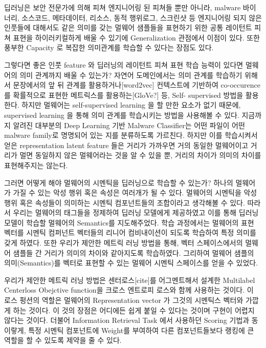 딥러닝은 보안 전문가에 의해 피쳐 엔지니어링 된 피쳐들 뿐만 아니라, malware 바이너리, 소스코드, 메타데이터, 리소스, 동적 행위로그, 스크린샷 등 엔지니어링 되지 않은 인풋들에 대해서도 같은 의미를 갖는 멀웨어 샘플들을 표현하기 위한 공통 레이턴트 피쳐 표현을 하이러키컬하게 배울 수 있기에 Generalization 관점에서 이점이 있다. 또한 풍부한 Capacity 로 복잡한 의미관계를 학습할 수 있다는 장점도 있다. 

그렇다면 좋은 인풋 feature 와 딥러닝의 레이턴트 피쳐 표현 학습 능력이 있다면 멀웨어의 의미 관계까지 배울 수 있는가? 자연어 도메인에서는 의미 관계를 학습하기 위해서 문장에서의 앞 뒤 관계를 활용하거나[word2vec] 컨텍스트에 기반하여 co-occurence 를 확률적으로 표현한 메트릭스를 활용하는[GloVe?] 등, Self- supervised 방법을 활용한다. 하지만 멀웨어는 self-supervised learning 을 할 만한 요소가 없기 때문에, supervised learning 을 통해 의미 관계를 학습시키는 방법을 사용해볼 수 있다. 지금까지 알려진 대부분의 Deep Learning 기반 Malware Classifier는 어떤 파일이 어떤 malware family로 명명되어 있는 지를 분류하도록 가르친다. 하지만 이를 학습시켜서 얻은 representation latent feature 들은 거리가 가까우면 거의 동일한 멀웨어이고 거리가 멀면 동일하지 않은 멀웨어라는 것을 알 수 있을 뿐, 거리의 차이가 의미의 차이를 표현해주지는 않는다.  

그러면 어떻게 해야 멀웨어의 시멘틱을 딥러닝으로 학습할 수 있는가? 하나의 멀웨어가 가질 수 있는 악성 행위 혹은 속성은 여러개가 될 수 있다. 멀웨어의 시멘틱을 악성 행위 혹은 속성들이 의미하는 시멘틱 컴포넌트들의 조합이라고 생각해볼 수 있다. 따라서 우리는 멀웨어의 태그들을 정제하여 딥러닝 모델에게 제공하였고 이를 통해 딥러닝 모델이 학습할 멀웨어의 Semantics를 지도해주었다. 학습 과정에서는 멀웨어의 표현 벡터를 시멘틱 컴퍼넌트 벡터들의 리니어 컴비내이션이 되도록 학습하여 특정 의미를 갖게 하였다. 또한 우리가 제안한 메트릭 러닝 방법을 통해, 벡터 스페이스에서의 멀웨어 샘플들 간 거리가 의미의 차이와 같아지도록 학습하였다. 그리하여 멀웨어 샘플의 의미(Semantics)를 벡터로 표현할 수 있는 멀웨어 시멘틱 스페이스를 얻을 수 있었다. 

우리가 제안한 메트릭 러닝 방법은 센터로스[cite]를 어그멘트해서 설계한 Multilabel Centerloss Obejctive function을 크로스 엔트로피 로스와 함께 사용하는 것이다. 이 로스 펑션의 역할은 멀웨어의 Representation vector 가 그것의 시멘틱스 벡터와 가깝게 하는 것이다. 이 것의 장점은 어디에든 쉽게 붙일 수 있다는 것이며 구현이 어렵지 않다는 것이다. 더불어 Information Retrieval Task 에서 사용하던 Scoring 기법과 동이랗게, 특정 시멘틱 컴포넌트에 Weight를 부여하여 다른 컴포넌트들보다 랭킹에 큰 역할을 할 수 있도록 제약을 줄 수 있다.  

